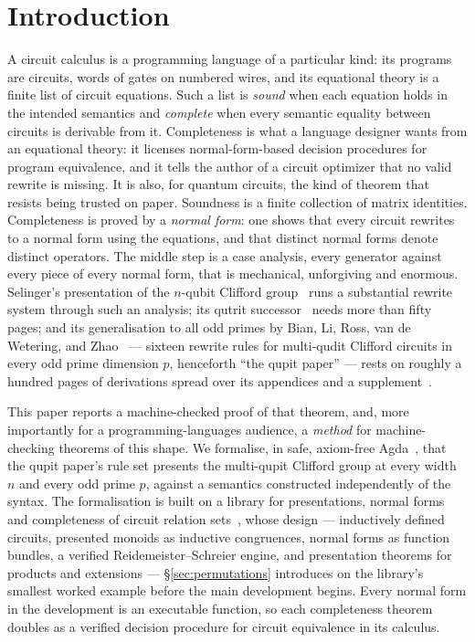 \section{Introduction}\label{sec:intro}

A circuit calculus is a programming language of a particular kind: its
programs are circuits, words of gates on numbered wires, and its
equational theory is a finite list of circuit equations.  Such a list is
\emph{sound} when each equation holds in the intended semantics and
\emph{complete} when every semantic equality between circuits is
derivable from it.  Completeness is what a language designer wants from
an equational theory: it licenses normal-form-based decision procedures
for program equivalence, and it tells the author of a circuit optimizer
that no valid rewrite is missing.  It is also, for quantum circuits, the
kind of theorem that resists being trusted on paper.  Soundness is a
finite collection of matrix identities.  Completeness is proved by a
\emph{normal form}: one shows that every circuit rewrites to a normal
form using the equations, and that distinct normal forms denote distinct
operators.  The middle step is a case analysis, every generator against
every piece of every normal form, that is mechanical, unforgiving and
enormous.  Selinger's presentation of the $n$-qubit Clifford
group~\cite{selinger2015clifford} runs a substantial rewrite system
through such an analysis; its qutrit successor~\cite{li2025qutrit} needs
more than fifty pages; and its generalisation to all odd primes by Bian,
Li, Ross, van de Wetering, and Zhao~\cite{bian2026qudit} --- sixteen
rewrite rules for multi-qudit Clifford circuits in every odd prime
dimension $p$, henceforth ``the qupit paper'' --- rests on roughly a
hundred pages of derivations spread over its appendices and a
supplement~\cite{bian2026supplement}.

This paper reports a machine-checked proof of that theorem, and, more
importantly for a programming-languages audience, a \emph{method} for
machine-checking theorems of this shape.  We formalise, in safe,
axiom-free Agda~\cite{norell2007thesis,agdastdlib}, that the qupit
paper's rule set presents the multi-qupit Clifford group at every width
$n$ and every odd prime $p$, against a semantics constructed
independently of the syntax.  The formalisation is built on a library
for presentations, normal forms and completeness of circuit relation
sets~\cite{bian2026framework,qupit-code}, whose design --- inductively
defined circuits, presented monoids as inductive congruences, normal
forms as function bundles, a verified Reidemeister--Schreier engine, and
presentation theorems for products and extensions ---
\S\ref{sec:permutations} introduces on the library's smallest worked
example before the main development begins.  Every
normal form in the development is an executable function, so each
completeness theorem doubles as a verified decision procedure for
circuit equivalence in its calculus.

